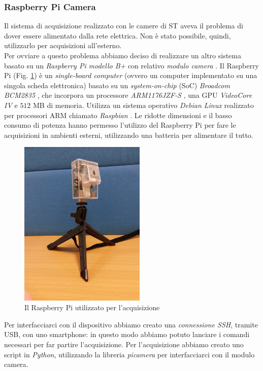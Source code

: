 \subsubsection{Raspberry Pi Camera}
Il sistema di acquisizione realizzato con le camere di ST aveva il problema di dover essere alimentato dalla rete elettrica.
Non \`e stato possibile, quindi, utilizzarlo per acquisizioni all'esterno.\\
Per ovviare a questo problema abbiamo deciso di realizzare un altro sistema basato su un \textit{Raspberry Pi modello B+} \cite{raspberry} con relativo \textit{modulo camera} \cite{raspberryCamera}.
Il Raspberry Pi (Fig. \ref{fig:raspberry}) \`e un \textit{single-board computer} (ovvero un computer implementato su una singola scheda elettronica) basato su un \textit{system-on-chip} (SoC) \textit{Broadcom BCM2835} \cite{broadcom}, che incorpora un processore \textit{ARM1176JZF-S} \cite{arm}, una GPU \textit{VideoCore IV} \cite{gpu} e $512$ MB di memoria.
Utilizza un sistema operativo \textit{Debian Linux} realizzato per processori ARM chiamato \textit{Raspbian} \cite{raspbian}.
Le ridotte dimensioni e il basso consumo di potenza hanno permesso l'utilizzo del Raspberry Pi per fare le acquisizioni in ambienti esterni, utilizzando una batteria per alimentare il tutto. 
\begin{figure}
	\centering
	\includegraphics[width=6cm]{./pictures/raspberry}
	\caption{Il Raspberry Pi utilizzato per l'acquisizione}
	\label{fig:raspberry}
\end{figure}
Per interfacciarci con il dispositivo abbiamo creato una \textit{connessione SSH}, tramite USB, con uno smartphone: in questo modo abbiamo potuto lanciare i comandi necessari per far partire l'acquisizione. 
Per l'acquisizione abbiamo creato uno script in \textit{Python}, utilizzando la libreria \textit{picamera} \cite{picamera} per interfacciarci con il modulo camera.
